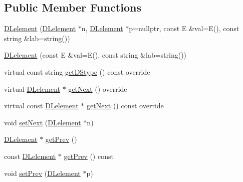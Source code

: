 \subsection*{Public Member Functions}
\begin{DoxyCompactItemize}
\item 
\mbox{\hyperlink{classbridges_1_1datastructure_1_1_d_lelement_a7384d570c355bb4762c98b79d4c1e988}{D\+Lelement}} (\mbox{\hyperlink{classbridges_1_1datastructure_1_1_d_lelement}{D\+Lelement}} $\ast$n, \mbox{\hyperlink{classbridges_1_1datastructure_1_1_d_lelement}{D\+Lelement}} $\ast$p=nullptr, const E \&val=E(), const string \&lab=string())
\item 
\mbox{\hyperlink{classbridges_1_1datastructure_1_1_d_lelement_af9c0dc9b417de0466a47be904cd845f6}{D\+Lelement}} (const E \&val=E(), const string \&lab=string())
\item 
virtual const string \mbox{\hyperlink{classbridges_1_1datastructure_1_1_d_lelement_a736ba8e6901608fb0ab04d781d2cceee}{get\+D\+Stype}} () const override
\item 
virtual \mbox{\hyperlink{classbridges_1_1datastructure_1_1_d_lelement}{D\+Lelement}} $\ast$ \mbox{\hyperlink{classbridges_1_1datastructure_1_1_d_lelement_a63212051ea77d74bd751dea00288d2be}{get\+Next}} () override
\item 
virtual const \mbox{\hyperlink{classbridges_1_1datastructure_1_1_d_lelement}{D\+Lelement}} $\ast$ \mbox{\hyperlink{classbridges_1_1datastructure_1_1_d_lelement_a8599e5be5fc1771d4e8a40f6de67b4a7}{get\+Next}} () const override
\item 
void \mbox{\hyperlink{classbridges_1_1datastructure_1_1_d_lelement_ab0fe212dd0e3795b8f3f7978c6bdf805}{set\+Next}} (\mbox{\hyperlink{classbridges_1_1datastructure_1_1_d_lelement}{D\+Lelement}} $\ast$n)
\item 
\mbox{\hyperlink{classbridges_1_1datastructure_1_1_d_lelement}{D\+Lelement}} $\ast$ \mbox{\hyperlink{classbridges_1_1datastructure_1_1_d_lelement_ac0b2dd38b3e3acee503152c9aa88f61c}{get\+Prev}} ()
\item 
const \mbox{\hyperlink{classbridges_1_1datastructure_1_1_d_lelement}{D\+Lelement}} $\ast$ \mbox{\hyperlink{classbridges_1_1datastructure_1_1_d_lelement_a36120fa524459af75f7e8c1ae379ae20}{get\+Prev}} () const
\item 
void \mbox{\hyperlink{classbridges_1_1datastructure_1_1_d_lelement_a4bada3a954b68d2c4169b27b5b64ca97}{set\+Prev}} (\mbox{\hyperlink{classbridges_1_1datastructure_1_1_d_lelement}{D\+Lelement}} $\ast$p)
\end{DoxyCompactItemize}

